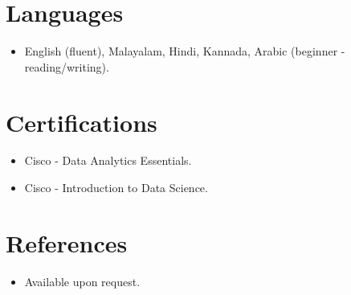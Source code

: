 \documentclass[11pt,a4paper,sans]{moderncv}
\begin{document}

\section{Languages}
\vspace{1pt}
\begin{itemize}
\item English (fluent), Malayalam, Hindi, Kannada, Arabic (beginner - reading/writing).
\end{itemize}


\section{Certifications}
\vspace{1pt}
\begin{itemize}
\item Cisco - Data Analytics Essentials.
\item Cisco - Introduction to Data Science.
\end{itemize}


\section{References}
\vspace{1pt}
\begin{itemize}
\item{Available upon request.}
\end{itemize}
\end{document}
